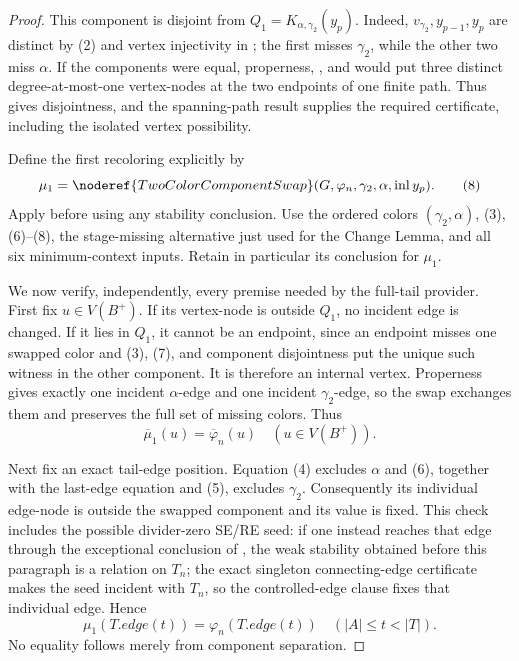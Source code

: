\begin{proof}
This component is disjoint from
\(Q_1=K_{\alpha,\gamma_2}(y_p)\).  Indeed,
\(v_{\gamma_2},y_{p-1},y_p\) are distinct by (2) and vertex injectivity
in ; the first misses \(\gamma_2\), while the
other two miss \(\alpha\).  If the components were equal, properness,
, and
 would put three distinct
degree-at-most-one vertex-nodes at the two endpoints of one finite path.
Thus  gives disjointness, and the
spanning-path result supplies the required
 certificate, including the isolated
vertex possibility.

Define the first recoloring explicitly by
\[
 \mu_1=\noderef{TwoColorComponentSwap}
       (G,\varphi_n,\gamma_2,\alpha,\operatorname{inl}y_p). \tag{8}
\]
Apply  before using any stability
conclusion.  Use the ordered colors \((\gamma_2,\alpha)\), (3), (6)--(8),
the stage-missing alternative just used for the Change Lemma, and all six
minimum-context inputs.  Retain in particular its
 conclusion for \(\mu_1\).

We now verify, independently, every premise needed by the full-tail
provider.  First fix \(u\in V(B^+)\).  If its vertex-node is outside
\(Q_1\), no incident edge is changed.  If it lies in \(Q_1\), it cannot
be an endpoint, since an endpoint misses one swapped color and (3), (7),
and component disjointness put the unique such witness in the other
component.  It is therefore an internal vertex.  Properness gives exactly
one incident \(\alpha\)-edge and one incident \(\gamma_2\)-edge, so the
swap exchanges them and preserves the full set of missing colors.  Thus
\[
 \overline\mu_1(u)=\overline\varphi_n(u)
                    \quad(u\in V(B^+)).                     \tag{9}
\]

Next fix an exact tail-edge position.  Equation (4) excludes \(\alpha\)
and (6), together with the last-edge equation and (5), excludes
\(\gamma_2\).  Consequently its individual edge-node is outside the
swapped component and its value is fixed.  This check includes the
possible divider-zero SE/RE seed: if one instead reaches that edge through
the exceptional conclusion of
, the weak stability obtained
before this paragraph is a  relation on \(T_n\); the exact
singleton connecting-edge certificate makes the seed incident with
\(T_n\), so the controlled-edge clause fixes that individual edge.  Hence
\[
 \mu_1(T.\mathit{edge}(t))=\varphi_n(T.\mathit{edge}(t))
                    \quad(|A|\le t<|T|).                    \tag{10}
\]
No equality follows merely from component separation.


\end{proof}
